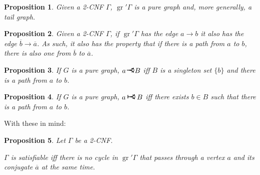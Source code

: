 \documentclass[11pt]{article}
\newcommand{\conj}[1]{\overline{#1}}
\DeclareMathOperator{\gr}{gr}
\newcommand{\rightcurveor}{
\!
\mathrel{
  \begin{tikzpicture}[scale=0.8]
    \draw[thick,->] (0,0) arc (90:150:-2ex);
    \draw[thick,->] (0,0) arc (90:30:2ex);
    \draw[thick] (-1ex, 0) -- (0.1ex,0);
  \end{tikzpicture}
}\!
}
\newcommand{\Rightcurveor}{
\mathrel{
  \begin{tikzpicture}[scale=0.8]
    \draw[thick,->] (0,0) arc (90:150:-2ex);
    \draw[thick,->] (0,0) arc (90:30:2ex);
    \draw[thick] (-1ex, 0) -- (0.1ex,0);
    \draw[thick] (-1ex, -0.7ex) -- (-1ex, 0.7ex);
  \end{tikzpicture}
}
}
\newtheorem{prop}{Proposition}
\begin{document}
\begin{prop}
Given a 2-CNF $\Gamma$, $\gr' \Gamma$ is a pure graph and, more generally, a tail graph.
\end{prop}

\begin{prop}
Given a 2-CNF $\Gamma$, if $\gr' \Gamma$ has the edge $a \rightarrow b$ it also has the edge $\conj b \rightarrow \conj a$. As such, it also has the property that if there is a path from $a$ to $b$, there is also one from $\conj b$ to $\conj a$.
\end{prop}

\begin{prop}
If $G$ is a pure graph, $a \rightcurveor B$ iff $B$ is a singleton set $\{b\}$ and there is a path from $a$ to $b$.
\end{prop}

\begin{prop}
If $G$ is a pure graph, $a \Rightcurveor B$ iff there exists $b \in B$ such that there is a path from $a$ to $b$.
\end{prop}

With these in mind:

\begin{prop} \label{2cnfcycle}
Let $\Gamma$ be a 2-CNF.

$\Gamma$ is satisfiable iff there is no cycle in $\gr' \Gamma$ that passes through a vertex $a$ and its conjugate $\conj a$ at the same time.
\end{prop}
\end{document}

